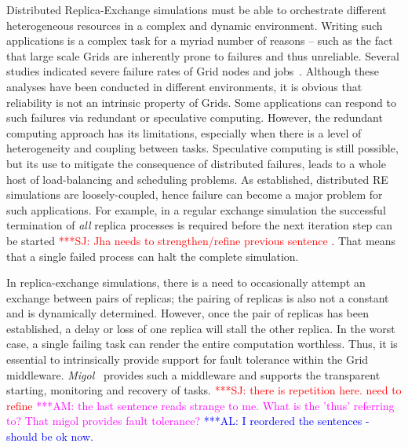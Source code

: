 \documentclass[times, 10pt, twocolumn]{article}
\newcommand{\alnote}[1]{ {\textcolor{blue} { ***AL: #1 }}}
\newcommand{\amnote}[1]{ {\textcolor{magenta} { ***AM: #1 }}}
\newcommand{\jhanote}[1]{ {\textcolor{red} { ***SJ: #1 }}}
\newcommand{\alnote}[1]{}
\newcommand{\amnote}[1]{}
\newcommand{\jhanote}[1]{}
\begin{document}
Distributed Replica-Exchange simulations %
must
be able to orchestrate different heterogeneous resources in a complex
and dynamic environment.  Writing such applications 
is a complex task for a myriad number of reasons -- such as the fact  
that large scale Grids are inherently prone to failures and thus
unreliable.  
Several studies indicated severe failure rates of Grid
nodes and  
jobs~\cite{schroeder,10.1109/E-SCIENCE.2006.93,DBLP:conf/grid/KhaliliHOSC06}.
Although these analyses have been conducted in different environments,
it is obvious that reliability is not an intrinsic property
of Grids. Some applications can respond to such failures
via redundant or speculative computing.  However, the redundant
computing approach has its limitations, especially when there is a
level of heterogeneity and coupling between tasks.  Speculative
computing is still possible, but its use to mitigate the consequence
of distributed failures, leads to a whole host of load-balancing and
scheduling problems.  As established, distributed RE simulations are
loosely-coupled, hence failure can become a major problem for such
applications.  For example, in a regular exchange simulation the
successful termination of \textit{all} replica processes is required
before the next iteration step can be started \jhanote{Jha needs to
  strengthen/refine previous sentence}. That means that a single
failed process can halt the complete simulation.

In replica-exchange simulations, there is a need to occasionally
attempt an exchange between pairs of replicas; the pairing of replicas
is also not a constant and is dynamically determined. However, once
the pair of replicas has been established, a delay or loss of one
replica will stall the other replica. In the worst case, a single
failing task can render the entire computation worthless.    
Thus, it is essential to intrinsically provide support
for fault tolerance within the Grid middleware.
\emph{Migol}~\cite{schnorLuckow08} provides such a
middleware and supports 
the transparent starting, monitoring and recovery of tasks.  
\jhanote{there is repetition here. need to refine} \amnote{the last
  sentence reads strange to me.  What is the 'thus' referring to?  That
  migol provides fault tolerance?}      
\alnote{I reordered the sentences - should be ok now.}
\end{document}
